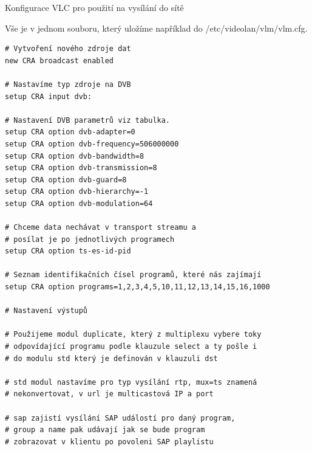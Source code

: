 \vspace{10pt}

Konfigurace VLC pro použití na vysílání do sítě

\vspace{10pt}

Vše je v jednom souboru, který uložíme například do /etc/videolan/vlm/vlm.cfg.

\vspace{10pt}

\begin{small}
\begin{verbatim}
# Vytvoření nového zdroje dat
new CRA broadcast enabled

# Nastavíme typ zdroje na DVB
setup CRA input dvb:

# Nastavení DVB parametrů viz tabulka.
setup CRA option dvb-adapter=0
setup CRA option dvb-frequency=506000000
setup CRA option dvb-bandwidth=8
setup CRA option dvb-transmission=8
setup CRA option dvb-guard=8
setup CRA option dvb-hierarchy=-1
setup CRA option dvb-modulation=64

# Chceme data nechávat v transport streamu a 
# posílat je po jednotlivých programech
setup CRA option ts-es-id-pid

# Seznam identifikačních čísel programů, které nás zajímají
setup CRA option programs=1,2,3,4,5,10,11,12,13,14,15,16,1000

# Nastavení výstupů

# Použijeme modul duplicate, který z multiplexu vybere toky 
# odpovídající programu podle klauzule select a ty pošle i
# do modulu std který je definován v klauzuli dst

# std modul nastavíme pro typ vysílání rtp, mux=ts znamená 
# nekonvertovat, v url je multicastová IP a port

# sap zajistí vysílání SAP událostí pro daný program, 
# group a name pak udávají jak se bude program
# zobrazovat v klientu po povoleni SAP playlistu


\end{verbatim}
\end{small}
